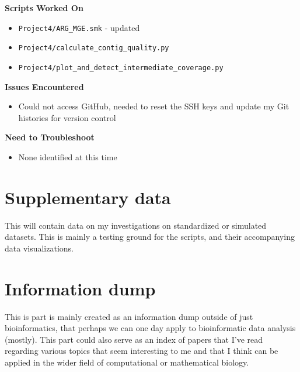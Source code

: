 \documentclass[11pt]{report}
\newcommand{\done}{\checkmark}
\begin{document}
{\begin{multicols}{2}
\textbf{Scripts Worked On}
\begin{itemize}
	\item \texttt{Project4/ARG\_MGE.smk} - updated
	\item [\done] \texttt  {Project4/calculate\_contig\_quality.py} 
	\item [\done] \texttt  {Project4/plot\_and\_detect\_intermediate\_coverage.py} 
\end{itemize}
\end{multicols}

\textbf{Issues Encountered}
\begin{itemize}
	\item [\done] Could not access GitHub, needed to reset the SSH keys and update my Git histories for version control
\end{itemize}

\textbf{Need to Troubleshoot}
\begin{itemize}
	\item None identified at this time
\end{itemize}


\newpage
\onecolumn


\newpage
\pagestyle{fancy}
\fancyhf{}
\fancyhead[C]{\leftmark}  %
\fancyhead[R]{\thepage}

\part{Supplementary data}
This will contain data on my investigations on standardized or simulated datasets. This is mainly a testing ground for the scripts, and their accompanying data visualizations. 

\renewcommand{\thesection}{\arabic{section}}
\setcounter{section}{0}
\setcounter{subsection}{0}


\part{Information dump}
This is part is mainly created as an information dump outside of just bioinformatics, that perhaps we can one day apply to bioinformatic data analysis (mostly). This part could also serve as an index of papers that I've read regarding various topics that seem interesting to me and that I think can be applied in the wider field of computational or mathematical biology. 



}
\end{document}
